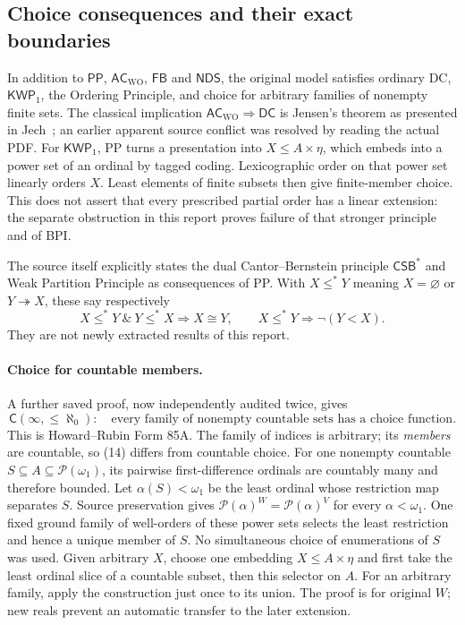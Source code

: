 \subsection{Choice consequences and their exact boundaries}

In addition to $\mathsf{PP}$, $\mathsf{AC}_{\mathrm{WO}}$,
$\mathsf{FB}$ and $\mathsf{NDS}$, the original model satisfies ordinary
DC, $\mathsf{KWP}_1$, the Ordering Principle, and choice for arbitrary
families of nonempty finite sets. The classical implication
$\mathsf{AC}_{\mathrm{WO}}\Rightarrow\mathsf{DC}$ is Jensen's theorem
as presented in Jech~\cite[Theorem 8.2]{Jech}; an earlier apparent source
conflict was resolved by reading the actual PDF. For $\mathsf{KWP}_1$,
PP turns a presentation into $X\leq A\times\eta$, which embeds into a
power set of an ordinal by tagged coding. Lexicographic order on that
power set linearly orders $X$. Least elements of finite subsets then
give finite-member choice. This does not assert that every prescribed
partial order has a linear extension: the separate obstruction in this
report proves failure of that stronger principle and of BPI.

The source itself explicitly states the dual Cantor--Bernstein principle
$\mathsf{CSB}^*$ and Weak Partition Principle as consequences of PP.
With $X\leq^*Y$ meaning $X=\varnothing$ or $Y\twoheadrightarrow X$,
these say respectively
\[
 X\leq^*Y\ \&\ Y\leq^*X\Rightarrow X\cong Y,
 \qquad X\leq^*Y\Rightarrow\neg(Y<X).
\]
They are not newly extracted results of this report.

\paragraph{Choice for countable members.}
A further saved proof, now independently audited twice, gives
\[
 \mathsf C(\infty,\leq\aleph_0):\quad
 \text{every family of nonempty countable sets has a choice function}.
                                                                  \tag{14}
\]
This is Howard--Rubin Form 85A. The family of indices is arbitrary;
its \emph{members} are countable, so (14) differs from countable choice.
For one nonempty countable $S\subseteq A\subseteq\mathcal P(\omega_1)$,
its pairwise first-difference ordinals are countably many and therefore
bounded. Let $\alpha(S)<\omega_1$ be the least ordinal whose restriction
map separates $S$. Source preservation gives
$\mathcal P(\alpha)^W=\mathcal P(\alpha)^V$ for every $\alpha<\omega_1$.
One fixed ground family of well-orders of these power sets selects the
least restriction and hence a unique member of $S$. No simultaneous
choice of enumerations of $S$ was used. Given arbitrary $X$, choose one
embedding $X\leq A\times\eta$ and first take the least ordinal slice of
a countable subset, then this selector on $A$. For an arbitrary family,
apply the construction just once to its union. The proof is for original
$W$; new reals prevent an automatic transfer to the later extension.

